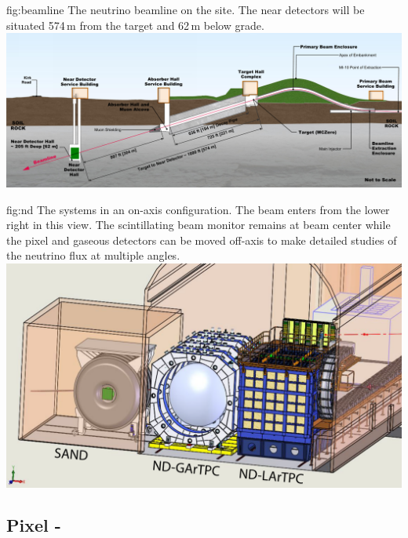 \documentclass[../main-v1.tex]{subfiles}
\begin{document}
 \begin{dunefigure}
{fig:beamline} %
{The neutrino beamline on the  site. The near detectors will be situated 574\,m from the target and 62\,m below grade.}
\includegraphics[height=0.3\textwidth]{graphics/IntroFigures/beamline-sideview.png}
\end{dunefigure}

 
 \begin{dunefigure}
{fig:nd}
{The  systems in an on-axis configuration.  The beam enters from the lower right in this view. The  scintillating beam monitor remains at beam center while the pixel %
 and gaseous   detectors can be moved off-axis to make detailed studies of the neutrino flux at multiple angles.}
\includegraphics[height=0.5\textwidth]{graphics/IntroFigures/All3Detectors.pdf}
\end{dunefigure}

 \subsection{Pixel  -  }
 
\end{document}
